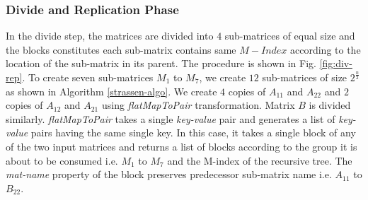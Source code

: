 \subsubsection{Divide and Replication Phase}
In the divide step, the matrices are divided into $4$ sub-matrices of equal size and the blocks constitutes each sub-matrix contains same $M-Index$ according to the location of the sub-matrix in its parent. The procedure is shown in Fig. \ref{fig:div-rep}. To create seven sub-matrices $M_{1}$ to $M_{7}$, we create $12$ sub-matrices of size $2^{\frac{n}{2}}$ as shown in Algorithm \ref{strassen-algo}. We create $4$ copies of $A_{11}$ and $A_{22}$ and $2$ copies of $A_{12}$ and $A_{21}$ using \textit{flatMapToPair} transformation. Matrix $B$ is divided similarly. \textit{flatMapToPair} takes a single \textit{key-value} pair and generates a list of \textit{key-value} pairs having the same single key. In this case, it takes a single block of any of the two input matrices and returns a list of blocks according to the group it is about to be consumed i.e. $M_{1}$ to $M_{7}$ and the M-index of the recursive tree. The \textit{mat-name} property of the block preserves predecessor sub-matrix name i.e. $A_{11}$ to $B_{22}$.

